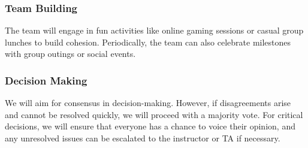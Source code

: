 \documentclass{article}
\begin{document}
\subsubsection*{Team Building}

The team will engage in fun activities like online gaming sessions or casual group lunches to build cohesion. Periodically, the team can also celebrate milestones with group outings or social events.

\subsubsection*{Decision Making}

We will aim for consensus in decision-making. However, if disagreements arise and cannot be resolved quickly, we will proceed with a majority vote. For critical decisions, we will ensure that everyone has a chance to voice their opinion, and any unresolved issues can be escalated to the instructor or TA if necessary.
\end{document}
